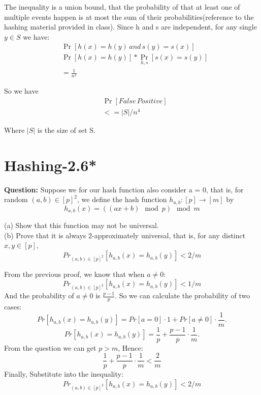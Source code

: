 \documentclass[12pt]{article}
\begin{document}
The inequality is a union bound, that the probability of that at least one of multiple events happen is at most the sum of their probabilities(reference to the hashing material provided in class). Since h and s are independent, for any single $y \in S$ we have:
\begin{equation}
\begin{aligned}
&\mathop{Pr} [h(x)=h(y) \, and \, s(y)=s(x)] \\
&\mathop{Pr} [h(x)=h(y)] * \mathop{Pr} \limits_{h,s} [s(x)=s(y)] \\
&= \frac{1}{n^4}
\end{aligned}
\end{equation}

So we have
\begin{equation}
\begin{aligned}
&\mathop{Pr}  [False \, Positive]\\
&<= |S|/n^4
\end{aligned}
\end{equation}

Where $|S|$ is the size of set S.

\section{Hashing-2.6*}
\textbf{Question:}
Suppose we for our hash function also consider a = 0, that is, for random \((a, b)\in[p]^2\), we define the hash function \(h_{a,b} : [p] \rightarrow [m]\) by
\[h_{a,b}(x) = ((ax + b)\mod{p} )\mod{m}\]

(a) Show that this function may not be universal.\\
(b) Prove that it is always 2-approximately universal, that is, for any distinct \(x, y \in [p]\), 
\[Pr_{(a,b)\in[p]^2}[h_{a,b}(x) = h_{a,b}(y)] < 2/m\]


From the previous proof, we know that when \(a \neq 0\):
\[Pr_{(a,b)\in[p]^2}[h_{a,b}(x) = h_{a,b}(y)] < 1/m\]
And the probability of \(a \neq 0\) is \(\frac{p-1}{p}\).
So we can calculate the probability of two cases:
\[
Pr[h_{a,b}(x) = h_{a,b}(y)] = Pr[a = 0] \cdot 1 + Pr[a \neq 0] \cdot \frac{1}{m}.
\]
\[
Pr[h_{a,b}(x) = h_{a,b}(y)] = \frac{1}{p} + \frac{p-1}{p} \cdot \frac{1}{m}.
\]
From the question we can get \(p>m\), Hence:
\[\frac{1}{p} + \frac{p-1}{p} \cdot \frac{1}{m}<\frac{2}{m}\]
Finally, Substitute into the inequality:
\[Pr_{(a,b)\in[p]^2}[h_{a,b}(x) = h_{a,b}(y)] < 2/m\]



\end{document}
